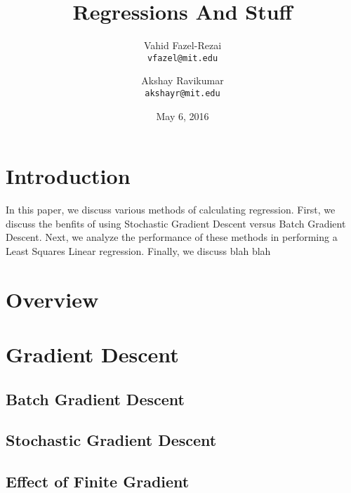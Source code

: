 \documentclass[letterpaper, twocolumn,11pt]{article}
\title{\textbf{Regressions And Stuff}}
\author{
\rm{Vahid Fazel-Rezai}\\
\rm{\texttt{vfazel@mit.edu}}
\and 
\rm{Akshay Ravikumar}\\
\rm{\texttt{akshayr@mit.edu}}
}
\date{May 6, 2016}
\begin{document}

\maketitle
\section{Introduction}

In this paper, we discuss various methods of calculating regression. First, we discuss the benfits of using Stochastic Gradient Descent versus Batch Gradient Descent. Next, we analyze the performance of these methods in performing a Least Squares Linear regression. Finally, we discuss blah blah

\section{Overview}


\section{Gradient Descent}
\subsection{Batch Gradient Descent}
\subsection{Stochastic Gradient Descent}
\subsection{Effect of Finite Gradient}
\end{document}
